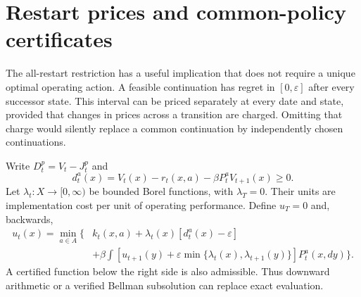 \section{Restart prices and common-policy certificates}\label{sec:prices47}
The all-restart restriction has a useful implication that does not require a unique optimal operating action. A feasible continuation has regret in $[0,\varepsilon]$ after every successor state. This interval can be priced separately at every date and state, provided that changes in prices across a transition are charged. Omitting that charge would silently replace a common continuation by independently chosen continuations.

Write $D_t^p=V_t-J_t^p$ and
\[
 d_t^a(x)=V_t(x)-r_t(x,a)-\beta P_t^aV_{t+1}(x)\ge0.
\]
Let $\lambda_t:X\to[0,\infty)$ be bounded Borel functions, with $\lambda_T=0$. Their units are implementation cost per unit of operating performance. Define $u_T=0$ and, backwards,
\begin{align}
 u_t(x)=\min_{a\in A}\big\{&k_t(x,a)+\lambda_t(x)[d_t^a(x)-\varepsilon]\label{eq:restart47}\\
 &+\beta\int[u_{t+1}(y)+\varepsilon\min\{\lambda_t(x),\lambda_{t+1}(y)\}]P_t^a(x,dy)\big\}.\nonumber
\end{align}
A certified function below the right side is also admissible. Thus downward arithmetic or a verified Bellman subsolution can replace exact evaluation.

